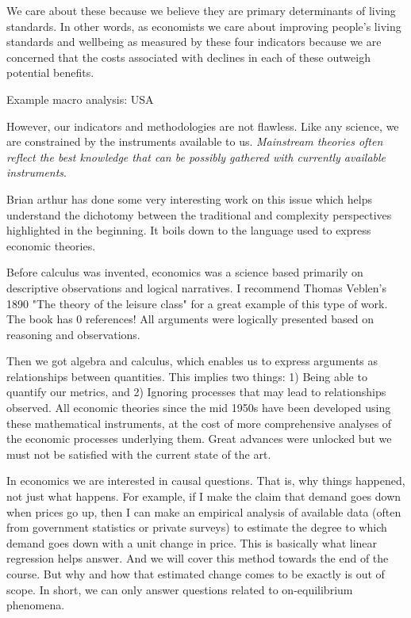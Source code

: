 \documentclass[10pt]{article}
\begin{document}
We care about these because we believe they are primary determinants of living standards. In other words, as economists we care about improving people's living standards and wellbeing as measured by these four indicators because we are concerned that the costs associated with declines in each of these outweigh potential benefits.

Example macro analysis: USA

However, our indicators and methodologies are not flawless. Like any science, we are constrained by the instruments available to us. \textit{Mainstream theories often reflect the best knowledge that can be possibly gathered with currently available instruments}.

Brian arthur has done some very interesting work on this issue which helps understand the dichotomy between the traditional and complexity perspectives highlighted in the beginning. It boils down to the language used to express economic theories.

Before calculus was invented, economics was a science based primarily on descriptive observations and logical narratives. I recommend Thomas Veblen's 1890 "The theory of the leisure class" for a great example of this type of work. The book has 0 references! All arguments were logically presented based on reasoning and observations.

Then we got algebra and calculus, which enables us to express arguments as relationships between quantities. This implies two things: 1) Being able to quantify our metrics, and 2) Ignoring processes that may lead to relationships observed. All economic theories since the mid 1950s have been developed using these mathematical instruments, at the cost of more comprehensive analyses of the economic processes underlying them. Great advances were unlocked but we must not be satisfied with the current state of the art.

In economics we are interested in causal questions. That is, why things happened, not just what happens. For example, if I make the claim that demand goes down when prices go up, then I can make an empirical analysis of available data (often from government statistics or private surveys) to estimate the degree to which demand goes down with a unit change in price. This is basically what linear regression helps answer. And we will cover this method towards the end of the course. But why and how that estimated change comes to be exactly is out of scope. In short, we can only answer questions related to on-equilibrium phenomena.
\end{document}
